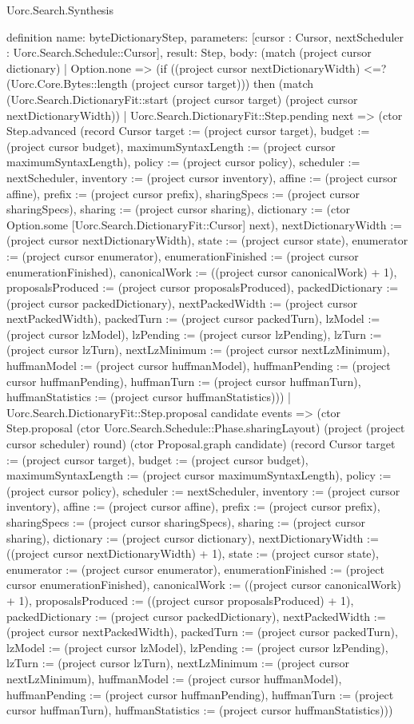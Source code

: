 \begin{lexlean}{Uorc.Search.Synthesis}
\begin{semanticmodule}
definition{
  name: byteDictionaryStep,
  parameters: [cursor : Cursor, nextScheduler : Uorc.Search.Schedule::Cursor],
  result: Step,
  body: (match (project cursor dictionary)
    | Option.none => (if ((project cursor nextDictionaryWidth) <=? (Uorc.Core.Bytes::length (project cursor target))) then (match (Uorc.Search.DictionaryFit::start (project cursor target) (project cursor nextDictionaryWidth))
      | Uorc.Search.DictionaryFit::Step.pending next => (ctor Step.advanced (record Cursor {target := (project cursor target), budget := (project cursor budget), maximumSyntaxLength := (project cursor maximumSyntaxLength), policy := (project cursor policy), scheduler := nextScheduler, inventory := (project cursor inventory), affine := (project cursor affine), prefix := (project cursor prefix), sharingSpecs := (project cursor sharingSpecs), sharing := (project cursor sharing), dictionary := (ctor Option.some [Uorc.Search.DictionaryFit::Cursor] next), nextDictionaryWidth := (project cursor nextDictionaryWidth), state := (project cursor state), enumerator := (project cursor enumerator), enumerationFinished := (project cursor enumerationFinished), canonicalWork := ((project cursor canonicalWork) + 1), proposalsProduced := (project cursor proposalsProduced), packedDictionary := (project cursor packedDictionary), nextPackedWidth := (project cursor nextPackedWidth), packedTurn := (project cursor packedTurn), lzModel := (project cursor lzModel), lzPending := (project cursor lzPending), lzTurn := (project cursor lzTurn), nextLzMinimum := (project cursor nextLzMinimum), huffmanModel := (project cursor huffmanModel), huffmanPending := (project cursor huffmanPending), huffmanTurn := (project cursor huffmanTurn), huffmanStatistics := (project cursor huffmanStatistics)}))
      | Uorc.Search.DictionaryFit::Step.proposal candidate events => (ctor Step.proposal (ctor Uorc.Search.Schedule::Phase.sharingLayout) (project (project cursor scheduler) round) (ctor Proposal.graph candidate) (record Cursor {target := (project cursor target), budget := (project cursor budget), maximumSyntaxLength := (project cursor maximumSyntaxLength), policy := (project cursor policy), scheduler := nextScheduler, inventory := (project cursor inventory), affine := (project cursor affine), prefix := (project cursor prefix), sharingSpecs := (project cursor sharingSpecs), sharing := (project cursor sharing), dictionary := (project cursor dictionary), nextDictionaryWidth := ((project cursor nextDictionaryWidth) + 1), state := (project cursor state), enumerator := (project cursor enumerator), enumerationFinished := (project cursor enumerationFinished), canonicalWork := ((project cursor canonicalWork) + 1), proposalsProduced := ((project cursor proposalsProduced) + 1), packedDictionary := (project cursor packedDictionary), nextPackedWidth := (project cursor nextPackedWidth), packedTurn := (project cursor packedTurn), lzModel := (project cursor lzModel), lzPending := (project cursor lzPending), lzTurn := (project cursor lzTurn), nextLzMinimum := (project cursor nextLzMinimum), huffmanModel := (project cursor huffmanModel), huffmanPending := (project cursor huffmanPending), huffmanTurn := (project cursor huffmanTurn), huffmanStatistics := (project cursor huffmanStatistics)}))
}
\end{semanticmodule}
\end{lexlean}

